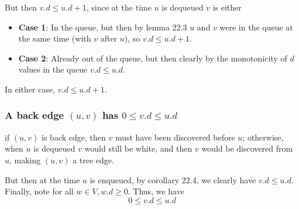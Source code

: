 \documentclass[paper=a4, fontsize=11pt]{scrartcl} %
\numberwithin{equation}{section} %
\numberwithin{figure}{section} %
\numberwithin{table}{section} %
\begin{document}
But then $v.d \leq u.d + 1$, since at the time $u$ is dequeued $v$ is either
\begin{itemize}
\item \textbf{Case 1}: In the queue, but then by lemma 22.3 $u$ and $v$ were in the queue at the same time (with $v$ after $u$), so $v.d \leq u.d + 1$.
\item \textbf{Case 2}: Already out of the queue, but then clearly by the monotonicity of $d$ values in the queue $v.d \leq u.d$.
\end{itemize}

In either case, $v.d \leq u.d + 1$.

\subsubsection{A back edge $(u,v)$ has $0 \leq v.d \leq u.d$}

if $(u,v)$ is back edge, then $v$ must have been discovered before $u$; otherwise, when $u$ is dequeued $v$ would still be white, and then $v$ would be discovered from $u$, making $(u,v)$ a tree edge.

But then at the time $u$ is enqueued, by corollary 22.4, we clearly have $v.d \leq u.d$. Finally, note for all $w \in V, w.d \geq 0$. Thus, we have
\[0 \leq v.d \leq u.d\]

\end{document}
